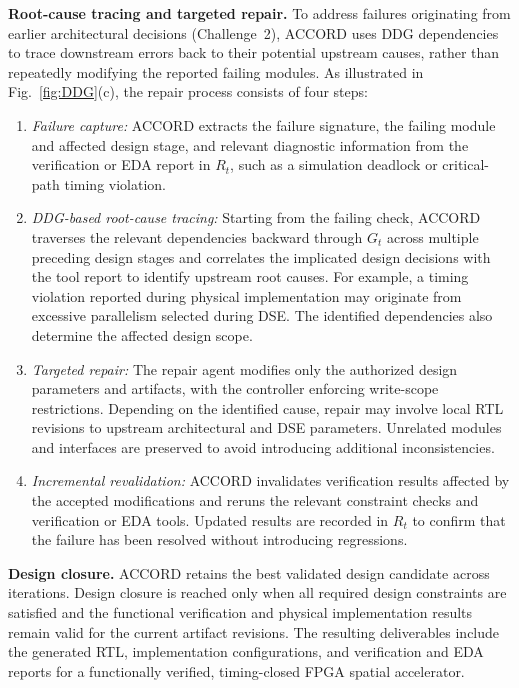 \documentclass[9pt,conference]{IEEEtran}
\begin{document}
\textbf{Root-cause tracing and targeted repair.}
To address failures originating from earlier architectural decisions (Challenge~2), ACCORD uses DDG dependencies to trace downstream errors back to their potential upstream causes, rather than repeatedly modifying the reported failing modules. As illustrated in Fig.~\ref{fig:DDG}(c), the repair process consists of four steps:
\begin{enumerate}
\item \emph{Failure capture:} ACCORD extracts the failure signature, the failing module and affected design stage, and relevant diagnostic information from the verification or EDA report in $R_t$, such as a simulation deadlock or critical-path timing violation.
\item \emph{DDG-based root-cause tracing:} Starting from the failing check, ACCORD traverses the relevant dependencies backward through $G_t$ across multiple preceding design stages and correlates the implicated design decisions with the tool report to identify upstream root causes. For example, a timing violation reported during physical implementation may originate from excessive parallelism selected during DSE. The identified dependencies also determine the affected design scope.
\item \emph{Targeted repair:} The repair agent modifies only the authorized design parameters and artifacts, with the controller enforcing write-scope restrictions. Depending on the identified cause, repair may involve local RTL revisions to upstream architectural and DSE parameters. Unrelated modules and interfaces are preserved to avoid introducing additional inconsistencies.
\item \emph{Incremental revalidation:} ACCORD invalidates verification results affected by the accepted modifications and reruns the relevant constraint checks and verification or EDA tools. Updated results are recorded in $R_t$ to confirm that the failure has been resolved without introducing regressions.
\end{enumerate}

\textbf{Design closure.}
ACCORD retains the best validated design candidate across iterations. Design closure is reached only when all required design constraints are satisfied and the functional verification and physical implementation results remain valid for the current artifact revisions. The resulting deliverables include the generated RTL, implementation configurations, and verification and EDA reports for a functionally verified, timing-closed FPGA spatial accelerator.
\end{document}
